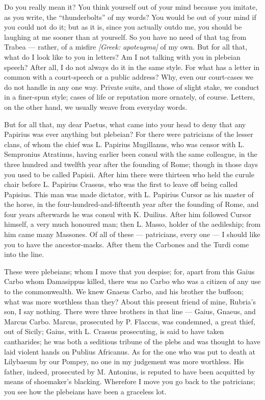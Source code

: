 

 Do you really mean it? You think yourself out of your mind because you imitate, as you write, the ``thunderbolts'' of my words? You would be out of your mind if you could not do it; but as it is, since you actually outdo me, you should be laughing at me sooner than at yourself. So you have no need of that tag from Trabea --- rather, of a misfire \textit{[Greek: apoteugma]} of my own. But for all that, what do I look like to you in letters? Am I not talking with you in plebeian speech? After all, I do not always do it in the same style. For what has a letter in common with a court-speech or a public address? Why, even our court-cases we do not handle in any one way. Private suits, and those of slight stake, we conduct in a finer-spun style; cases of life or reputation more ornately, of course. Letters, on the other hand, we usually weave from everyday words.

 But for all that, my dear Paetus, what came into your head to deny that any Papirius was ever anything but plebeian? For there were patricians of the lesser clans, of whom the chief was L. Papirius Mugillanus, who was censor with L. Sempronius Atratinus, having earlier been consul with the same colleague, in the three hundred and twelfth year after the founding of Rome; though in those days you used to be called Papisii. After him there were thirteen who held the curule chair before L. Papirius Crassus, who was the first to leave off being called Papisius. This man was made dictator, with L. Papirius Cursor as his master of the horse, in the four-hundred-and-fifteenth year after the founding of Rome, and four years afterwards he was consul with K. Duilius. After him followed Cursor himself, a very much honoured man; then L. Masso, holder of the aedileship; from him came many Massones. Of all of these --- patricians, every one --- I should like you to have the ancestor-masks. After them the Carbones and the Turdi come into the line.

 These were plebeians; whom I move that you despise; for, apart from this Gaius Carbo whom Damasippus killed, there was no Carbo who was a citizen of any use to the commonwealth. We knew Gnaeus Carbo, and his brother the buffoon; what was more worthless than they? About this present friend of mine, Rubria's son, I say nothing. There were three brothers in that line --- Gaius, Gnaeus, and Marcus Carbo. Marcus, prosecuted by P. Flaccus, was condemned, a great thief, out of Sicily; Gaius, with L. Crassus prosecuting, is said to have taken cantharides; he was both a seditious tribune of the plebs and was thought to have laid violent hands on Publius Africanus. As for the one who was put to death at Lilybaeum by our Pompey, no one in my judgement was more worthless. His father, indeed, prosecuted by M. Antonius, is reputed to have been acquitted by means of shoemaker's blacking. Wherefore I move you go back to the patricians; you see how the plebeians have been a graceless lot.

